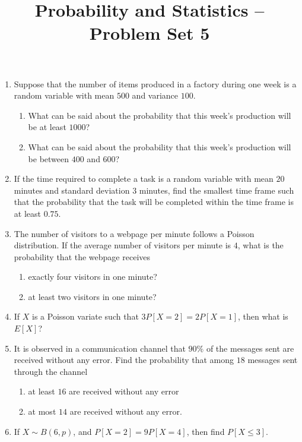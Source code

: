 \documentclass[svgnames]{amsart}
\title[]{Probability and Statistics -- Problem Set 5}
\begin{document}
\maketitle
\begin{enumerate}[leftmargin=*]
\item Suppose that the number of items produced in a factory during one week is a random variable with mean $500$ and variance $100$.
\begin{enumerate}
	\item What can be said about the probability that this week's production will be at least $1000$?
	\item What can be said about the probability that this week's production will be between $400$ and $600$?
\end{enumerate}

\item If the time required to complete a task is a random variable with mean $20$ minutes and standard deviation $3$ minutes, find the smallest time frame such that the probability that the task will be completed within the time frame is at least $0.75$.

\item The number of visitors to a webpage per minute follows a Poisson distribution. If the average number of visitors per minute is $4$, what is the probability that the webpage receives
\begin{enumerate}[label=(\roman*)]
	\item exactly four visitors in one minute?
	\item at least two visitors in one minute?
\end{enumerate}

\item If $X$ is a Poisson variate such that $3 P[X = 2] = 2P[X = 1]$, then what is $E[X]$?

\item  It is observed in a communication channel that $90\%$ of the messages sent are received without any error. Find the probability that among $18$ messages sent through the channel
\begin{enumerate}[label=(\roman*)]
	\item at least $16$ are received without any error
	\item at most $14$ are received without any error.
\end{enumerate}

\item If $X \sim B(6, p)$, and $P[X = 2] = 9P[X = 4]$, then find $P[X \le 3]$.


\end{enumerate}
\end{document}
